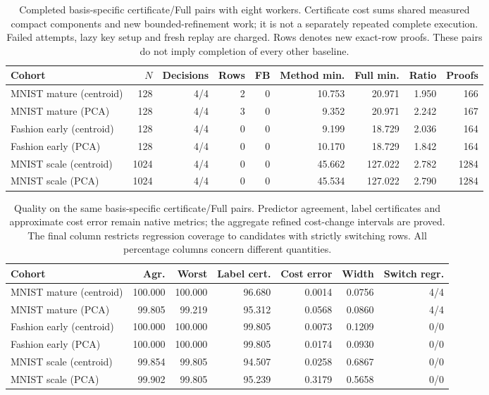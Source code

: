\begin{table}[tbp]
\centering
\caption{Completed basis-specific certificate/Full pairs with eight workers. Certificate cost sums shared measured compact components and new bounded-refinement work; it is not a separately repeated complete execution. Failed attempts, lazy key setup and fresh replay are charged. Rows denotes new exact-row proofs. These pairs do not imply completion of every other baseline.}
\label{tab:refinement-pilot}
\begin{adjustbox}{max width=.98\textwidth,center=\textwidth}
\begin{tabular}{lrrrrrrrr}
\toprule
Cohort & $N$ & Decisions & Rows & FB & Method min. & Full min. & Ratio & Proofs\\
\midrule
MNIST mature (centroid) & 128 & 4/4 & 2 & 0 & 10.753 & 20.971 & 1.950 & 166\\
MNIST mature (PCA) & 128 & 4/4 & 3 & 0 & 9.352 & 20.971 & 2.242 & 167\\
Fashion early (centroid) & 128 & 4/4 & 0 & 0 & 9.199 & 18.729 & 2.036 & 164\\
Fashion early (PCA) & 128 & 4/4 & 0 & 0 & 10.170 & 18.729 & 1.842 & 164\\
MNIST scale (centroid) & 1024 & 4/4 & 0 & 0 & 45.662 & 127.022 & 2.782 & 1284\\
MNIST scale (PCA) & 1024 & 4/4 & 0 & 0 & 45.534 & 127.022 & 2.790 & 1284\\
\bottomrule
\end{tabular}
\end{adjustbox}
\end{table}
\begin{table}[tbp]
\centering
\caption{Quality on the same basis-specific certificate/Full pairs. Predictor agreement, label certificates and approximate cost error remain native metrics; the aggregate refined cost-change intervals are proved. The final column restricts regression coverage to candidates with strictly switching rows. All percentage columns concern different quantities.}
\label{tab:refinement-pilot-quality}
\begin{adjustbox}{max width=.98\textwidth,center=\textwidth}
\begin{tabular}{lrrrrrr}
\toprule
Cohort & Agr. & Worst & Label cert. & Cost error & Width & Switch regr.\\
\midrule
MNIST mature (centroid) & 100.000 & 100.000 & 96.680 & 0.0014 & 0.0756 & 4/4\\
MNIST mature (PCA) & 99.805 & 99.219 & 95.312 & 0.0568 & 0.0860 & 4/4\\
Fashion early (centroid) & 100.000 & 100.000 & 99.805 & 0.0073 & 0.1209 & 0/0\\
Fashion early (PCA) & 100.000 & 100.000 & 99.805 & 0.0174 & 0.0930 & 0/0\\
MNIST scale (centroid) & 99.854 & 99.805 & 94.507 & 0.0258 & 0.6867 & 0/0\\
MNIST scale (PCA) & 99.902 & 99.805 & 95.239 & 0.3179 & 0.5658 & 0/0\\
\bottomrule
\end{tabular}
\end{adjustbox}
\end{table}
